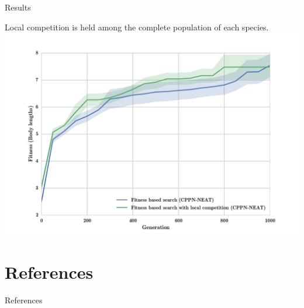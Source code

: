 \documentclass{beamer}
\begin{document}
\begin{frame}[allowframebreaks]{Results}
\begin{minipage}{\textwidth}
\begin{block}{Local competition is held among the complete population of each species.}
\includegraphics[width=1.0\textwidth]{figures/results/fitComp100percent.pdf}
\end{block}
\end{minipage}
\end{frame}


\section{References}

\begin{frame}[allowframebreaks]{References}


\end{frame}
\end{document}
